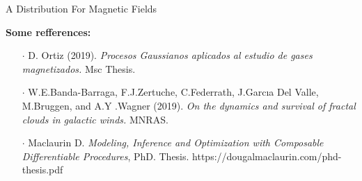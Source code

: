 \documentclass{beamer}
\begin{document}
\begin{frame}{A Distribution For Magnetic Fields}

  \textbf{Some refferences:}

  \vspace{1em}

  \begin{itemize}
    \item[$\cdot$] D. Ortiz (2019). \emph{Procesos Gaussianos aplicados al estudio de gases magnetizados.} Msc Thesis.
    \item[$\cdot$] W.E.Banda-Barraga, F.J.Zertuche, C.Federrath, J.Garcıa Del Valle, M.Bruggen, and A.Y .Wagner (2019). \emph{On the dynamics and survival of fractal clouds in galactic winds.} MNRAS.
    \item[$\cdot$] Maclaurin D. \emph{Modeling, Inference and Optimization with Composable Differentiable Procedures}, PhD. Thesis. https://dougalmaclaurin.com/phd-thesis.pdf
  \end{itemize}
\end{frame}
\end{document}
